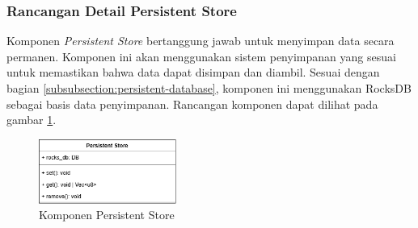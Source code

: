 \subsubsection{Rancangan Detail Persistent Store}
\label{subsubsection:detail-persistent-store}

Komponen \textit{Persistent Store} bertanggung jawab untuk menyimpan data secara permanen. Komponen ini akan menggunakan sistem penyimpanan yang sesuai untuk memastikan bahwa data dapat disimpan dan diambil. Sesuai dengan bagian \ref{subsubsection:persistent-database}, komponen ini menggunakan RocksDB sebagai basis data penyimpanan. Rancangan komponen dapat dilihat pada gambar \ref{fig:persistent-store-component}.

\begin{figure}[ht]
    \centering
    \includegraphics[width=0.4\textwidth]{resources/chapter-3/persistent-store-component.png}
    \caption{Komponen Persistent Store}
    \label{fig:persistent-store-component}
\end{figure}